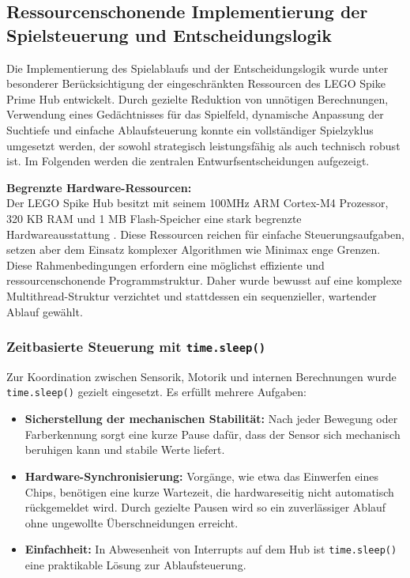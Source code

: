 \subsection{Ressourcenschonende Implementierung der Spielsteuerung und Entscheidungslogik}

Die Implementierung des Spielablaufs und der Entscheidungslogik wurde unter besonderer Berücksichtigung der eingeschränkten Ressourcen des LEGO Spike Prime Hub entwickelt. Durch gezielte Reduktion von unnötigen Berechnungen, Verwendung eines Gedächtnisses für das Spielfeld, dynamische Anpassung der Suchtiefe und einfache Ablaufsteuerung konnte ein vollständiger Spielzyklus umgesetzt werden, der sowohl strategisch leistungsfähig als auch technisch robust ist. Im Folgenden werden die zentralen Entwurfsentscheidungen aufgezeigt.

\textbf{Begrenzte Hardware-Ressourcen:}\\
Der LEGO Spike Hub besitzt mit seinem 100MHz ARM Cortex-M4 Prozessor, 320 KB RAM und 1 MB Flash-Speicher eine stark begrenzte Hardwareausstattung \cite{lego2020techniclargehub}. Diese Ressourcen reichen für einfache Steuerungsaufgaben, setzen aber dem Einsatz komplexer Algorithmen wie Minimax enge Grenzen.
Diese Rahmenbedingungen erfordern eine möglichst effiziente und ressourcenschonende Programmstruktur. Daher wurde bewusst auf eine komplexe Multithread-Struktur verzichtet und stattdessen ein sequenzieller, wartender Ablauf gewählt.

\subsubsection*{Zeitbasierte Steuerung mit \texttt{time.sleep()}}

Zur Koordination zwischen Sensorik, Motorik und internen Berechnungen wurde \texttt{time.sleep()} gezielt eingesetzt. Es erfüllt mehrere Aufgaben:

\begin{itemize}
	\item \textbf{Sicherstellung der mechanischen Stabilität:} Nach jeder Bewegung oder Farberkennung sorgt eine kurze Pause dafür, dass der Sensor sich mechanisch beruhigen kann und stabile Werte liefert.
	\item \textbf{Hardware-Synchronisierung:}  Vorgänge, wie etwa das Einwerfen eines Chips, benötigen eine kurze Wartezeit, die hardwareseitig nicht automatisch rückgemeldet wird. Durch gezielte Pausen wird so ein zuverlässiger Ablauf ohne ungewollte Überschneidungen erreicht.
	\item \textbf{Einfachheit:} In Abwesenheit von Interrupts auf dem Hub ist \texttt{time.sleep()} eine praktikable Lösung zur Ablaufsteuerung.
\end{itemize}

